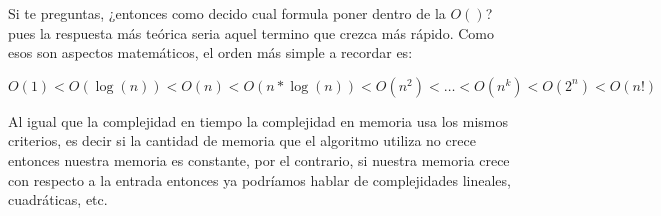 Si te preguntas, ¿entonces como decido cual formula poner dentro de la $O()$? pues la respuesta más teórica seria aquel termino que crezca más rápido. Como esos son aspectos matemáticos, el orden más simple a recordar es: 
 
 $$O(1) < O(\log(n)) < O(n) < O(n*\log(n)) < O(n^2) < \dots < O(n^k) < O(2^n) < O(n!)$$
 
 Al igual que la complejidad en tiempo la complejidad en memoria usa los mismos criterios, es decir si la cantidad de memoria que el algoritmo utiliza no crece entonces nuestra memoria es constante, por el contrario, si nuestra memoria crece con respecto a la entrada entonces ya podríamos hablar de complejidades lineales, cuadráticas, etc.


